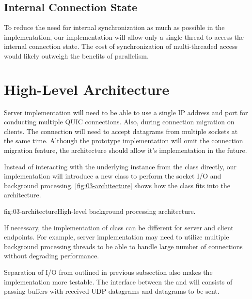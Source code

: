 \subsection{Internal Connection State}

To reduce the need for internal synchronization as much as possible in the \QuicConnection{}
implementation, our implementation will allow only a single thread to access the internal connection
state. The cost of synchronization of multi-threaded access would likely outweigh the benefits of
parallelism.

\section{High-Level Architecture}

Server implementation will need to be able to use a single IP address and port for conducting
multiple QUIC connections. Also, during connection migration on clients. The connection will need to
accept datagrams from multiple sockets at the same time. Although the prototype implementation will
omit the connection migration feature, the architecture should allow it's implementation in the
future.

Instead of interacting with the underlying  instance from the \QuicConnection{} class
directly, our implementation will introduce a new \QuicSocketContext{} class to perform the socket
I/O and background processing. \autoref{fig:03-architecture} shows how the \QuicSocketContext{}
class fits into the architecture.

\begin{myFigure}{fig:03-architecture}{High-level background processing architecture.}

  

\end{myFigure}

If necessary, the implementation of \QuicSocketContext{} class can be different for server and
client endpoints. For example, server implementation may need to utilize multiple background
processing threads to be able to handle large number of connections without degrading performance.


Separation of I/O from \QuicConnection{} outlined in previous subsection also makes the
implementation more testable. The interface between the \QuicSocketContext{} and \QuicConnection{}
will consists of passing buffers with received UDP datagrams and datagrams to be sent.

